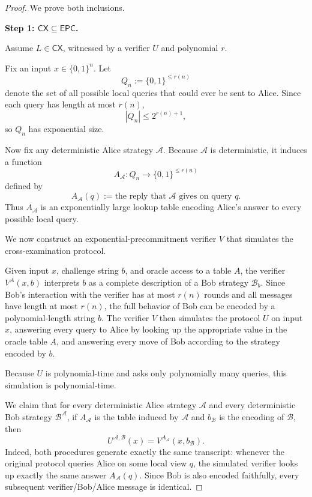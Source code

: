 \documentclass[11pt]{article}
\begin{document}
\begin{proof}
We prove both inclusions.

\medskip

\noindent\textbf{Step 1: \(\mathsf{CX} \subseteq \mathsf{EPC}\).}

Assume \(L \in \mathsf{CX}\), witnessed by a verifier \(U\) and polynomial \(r\).

Fix an input \(x \in \{0,1\}^n\). Let
\[
Q_n := \{0,1\}^{\le r(n)}
\]
denote the set of all possible local queries that could ever be sent to Alice. Since each query has length at most \(r(n)\),
\[
|Q_n| \le 2^{r(n)+1},
\]
so \(Q_n\) has exponential size.

Now fix any deterministic Alice strategy \(\mathcal A\). Because \(\mathcal A\) is deterministic, it induces a function
\[
A_{\mathcal A} : Q_n \to \{0,1\}^{\le r(n)}
\]
defined by
\[
A_{\mathcal A}(q) := \text{the reply that } \mathcal A \text{ gives on query } q.
\]
Thus \(A_{\mathcal A}\) is an exponentially large lookup table encoding Alice's answer to every possible local query.

We now construct an exponential-precommitment verifier \(V\) that simulates the cross-examination protocol.

Given input \(x\), challenge string \(b\), and oracle access to a table \(A\), the verifier \(V^A(x,b)\) interprets \(b\) as a complete description of a Bob strategy \(\mathcal B_b\). Since Bob's interaction with the verifier has at most \(r(n)\) rounds and all messages have length at most \(r(n)\), the full behavior of Bob can be encoded by a polynomial-length string \(b\). The verifier \(V\) then simulates the protocol \(U\) on input \(x\), answering every query to Alice by looking up the appropriate value in the oracle table \(A\), and answering every move of Bob according to the strategy encoded by \(b\).

Because \(U\) is polynomial-time and asks only polynomially many queries, this simulation is polynomial-time.

We claim that for every deterministic Alice strategy \(\mathcal A\) and every deterministic Bob strategy \(\mathcal B^{\mathcal A}\), if \(A_{\mathcal A}\) is the table induced by \(\mathcal A\) and \(b_{\mathcal B}\) is the encoding of \(\mathcal B\), then
\[
U^{\mathcal A,\mathcal B}(x) = V^{A_{\mathcal A}}(x,b_{\mathcal B}).
\]
Indeed, both procedures generate exactly the same transcript: whenever the original protocol queries Alice on some local view \(q\), the simulated verifier looks up exactly the same answer \(A_{\mathcal A}(q)\). Since Bob is also encoded faithfully, every subsequent verifier/Bob/Alice message is identical.


\end{proof}
\end{document}
